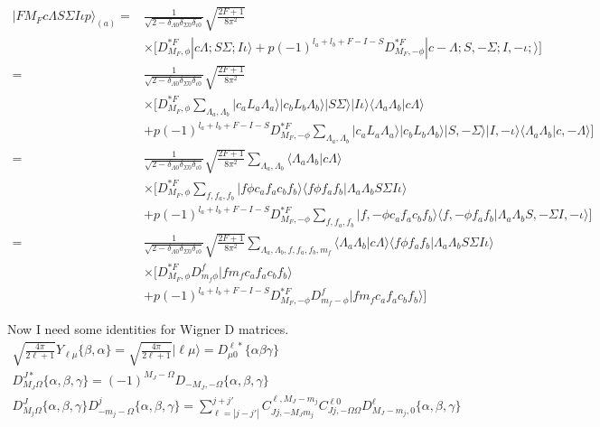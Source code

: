 \documentclass[prl, longbibliography]{revtex4-2}
\begin{document}
\begin{equation}
\begin{split}
|F M_F c \Lambda S \Sigma I \iota p\rangle_{(a)} 
= &\frac{1}{\sqrt{2-\delta_{\Lambda 0}\delta_{\Sigma 0}\delta_{\iota 0}}} \sqrt{\frac{2F+1}{8\pi^2}}\\
&\times\Bigg[D_{M_F,\phi}^{* F} 
|c\Lambda ;S\Sigma; I \iota\rangle
+p(-1)^{l_a+l_b+F-I-S}D_{M_F,-\phi}^{* F} 
|c-\Lambda; S,-\Sigma; I, -\iota;\rangle\Bigg]
\\
= &\frac{1}{\sqrt{2-\delta_{\Lambda 0}\delta_{\Sigma 0}\delta_{\iota 0}}} \sqrt{\frac{2F+1}{8\pi^2}}\\
&\times\Bigg[D_{M_F,\phi}^{* F} 
\sum_{\Lambda_a, \Lambda_b}|c_a L_a \Lambda_a \rangle |c_b L_b \Lambda_b\rangle |S\Sigma\rangle |I\iota\rangle\langle\Lambda_a \Lambda_b|c\Lambda\rangle\\
&+p(-1)^{l_a+l_b+F-I-S}D_{M_F,-\phi}^{* F} 
\sum_{\Lambda_a, \Lambda_b}|c_a L_a \Lambda_a \rangle |c_b L_b \Lambda_b\rangle |S,-\Sigma\rangle |I,-\iota\rangle\langle\Lambda_a \Lambda_b|c,-\Lambda\rangle
\Bigg]
\\
= &\frac{1}{\sqrt{2-\delta_{\Lambda 0}\delta_{\Sigma 0}\delta_{\iota 0}}} \sqrt{\frac{2F+1}{8\pi^2}}
\sum_{\Lambda_a, \Lambda_b}
\langle\Lambda_a \Lambda_b|c\Lambda\rangle\\
&\times\Bigg[D_{M_F,\phi}^{* F} 
\sum_{f,f_a,f_b} |f\phi c_a f_a c_b f_b \rangle \langle f\phi f_a f_b | \Lambda_a \Lambda_b S\Sigma I \iota \rangle\\
&+p(-1)^{l_a+l_b+F-I-S}D_{M_F,-\phi}^{* F}
\sum_{f,f_a,f_b} |f,-\phi c_a f_a c_b f_b \rangle \langle f,-\phi f_a f_b | \Lambda_a \Lambda_b S,-\Sigma I, -\iota \rangle\Bigg]
\\
= &\frac{1}{\sqrt{2-\delta_{\Lambda 0}\delta_{\Sigma 0}\delta_{\iota 0}}}
\sqrt{\frac{2F+1}{8\pi^2}}
\sum_{\Lambda_a, \Lambda_b, f, f_a, f_b, m_f}
\langle\Lambda_a \Lambda_b|c\Lambda\rangle
\langle f\phi f_a f_b | \Lambda_a \Lambda_b S\Sigma I \iota \rangle\\
&\times\Bigg[D_{M_F,\phi}^{* F} 
D_{m_f \phi}^{f}|f m_f c_a f_a c_b f_b\rangle\\
&+p(-1)^{l_a+l_b+F-I-S}D_{M_F,-\phi}^{* F}
D_{m_f -\phi}^{f}|f m_f c_a f_a c_b f_b\rangle\Bigg]
\end{split}
\end{equation}

Now I need some identities for Wigner D matrices.
\begin{equation}
\begin{split}
\sqrt{\frac{4\pi}{2\ell+1}}Y_{\ell \mu}\{\beta, \alpha\}=\sqrt{\frac{4\pi}{2\ell+1}}|\ell\mu\rangle=D^{\ell *}_{\mu 0} \{\alpha \beta \gamma\}\\
D^{J*}_{M_J \Omega}\{\alpha,\beta,\gamma\} =(-1)^{M_J-\Omega} D_{-M_J,-\Omega}\{\alpha,\beta,\gamma\}\\
D_{M_j\Omega}^{J}\{\alpha,\beta,\gamma\}D_{-m_j -\Omega}^{j}\{\alpha,\beta,\gamma\} 
= \sum_{\ell=|j-j'|}^{j+j'}
C_{Jj, -M_J m_j}^{\ell, M_J - m_j}
C_{Jj, -\Omega \Omega}^{\ell 0}
D^{\ell}_{M_J - m_j,0}\{\alpha,\beta,\gamma\}
\end{split}
\end{equation}
\end{document}
